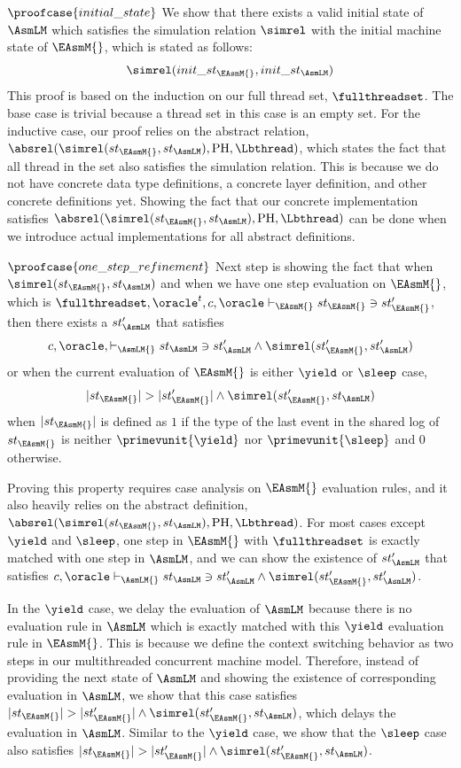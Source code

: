  $\proofcase{initial\_state}$ We show that there exists a valid initial state of $\AsmLM$ which satisfies the simulation relation
$\simrel$ with the initial machine state of $\EAsmM{}$, which is stated as follows:
$$\simrel(init\_st_{\EAsmM{}}, init\_st_{\AsmLM})$$
This proof is based on the induction on our full thread set, $\fullthreadset$. 
The base case is trivial because a thread set in this case is an empty set.
For the inductive case, our proof relies on the abstract relation, $\absrel(\simrel(st_{\EAsmM{}}, st_{\AsmLM}), \mathrm{PH}, \Lbthread)$, which states the fact that
 all thread in the set also satisfies the simulation relation. 
This is because we do not have concrete data type definitions, a concrete layer definition, and other concrete definitions yet. 
Showing the fact that our concrete implementation satisfies  $\absrel(\simrel(st_{\EAsmM{}}, st_{\AsmLM}), \mathrm{PH}, \Lbthread)$ can be done when we introduce actual implementations for all abstract definitions.

$\proofcase{one\_step\_refinement}$
Next step is showing the fact that when $\simrel(st_{\EAsmM{}}, st_{\AsmLM})$ and when we have one step evaluation on $\EAsmM{}$, which is $\fullthreadset, \oracle^t, c, \oracle  \vdash_{\EAsmM{}} st_{\EAsmM{}} \ni st'_{\EAsmM{}} $, 
then there exists a $st'_{\AsmLM}$ that satisfies 
$$c, \oracle, \vdash_{\AsmLM{}} st_{\AsmLM} \ni st'_{\AsmLM} \wedge \simrel(st'_{\EAsmM{}}, st'_{\AsmLM})$$
or when the current evaluation of $\EAsmM{}$ is either $\yield$ or $\sleep$ case, 
$$\vert st_{\EAsmM{}} \vert > \vert st'_{\EAsmM{}} \vert \wedge \simrel(st'_{\EAsmM{}}, st_{\AsmLM})$$
when $\vert st_{\EAsmM{}} \vert$ is defined as $1$ if the type of the last event in the shared log of $st_{\EAsmM{}}$ 
is neither $\primevunit{\yield}$ nor $\primevunit{\sleep}$ and $0$ otherwise.

Proving this property requires case analysis on $\EAsmM{}$ evaluation rules, and it  
also heavily relies on the abstract definition,  $\absrel(\simrel(st_{\EAsmM{}}, st_{\AsmLM}), \mathrm{PH}, \Lbthread)$.
For most cases except $\yield$ and $\sleep$, one step in $\EAsmM{}$ with $\fullthreadset$ 
is exactly matched with one step in $\AsmLM$, and we can show the existence of $st'_{\AsmLM}$ that satisfies 
$c, \oracle\vdash_{\AsmLM{}} st_{\AsmLM} \ni st'_{\AsmLM} \wedge \simrel(st'_{\EAsmM{}}, st'_{\AsmLM})$.

In the $\yield$ case, we delay the evaluation of $\AsmLM$ because there is no evaluation rule in $\AsmLM$
which is exactly matched with this $\yield$ evaluation rule in $\EAsmM{}$. 
This is because we define the context switching behavior 
as two steps in our multithreaded concurrent machine model.
Therefore, instead of providing the next state of $\AsmLM$ and showing the existence of corresponding 
evaluation in $\AsmLM$, 
we show that this 
case satisfies $\vert st_{\EAsmM{}} \vert > \vert st'_{\EAsmM{}} \vert \wedge \simrel(st'_{\EAsmM{}}, st_{\AsmLM})$, 
which delays the evaluation in $\AsmLM$. 
Similar to the $\yield$ case, we show that the $\sleep$ case also 
satisfies $\vert st_{\EAsmM{}} \vert > \vert st'_{\EAsmM{}} \vert \wedge \simrel(st'_{\EAsmM{}}, st_{\AsmLM})$.

